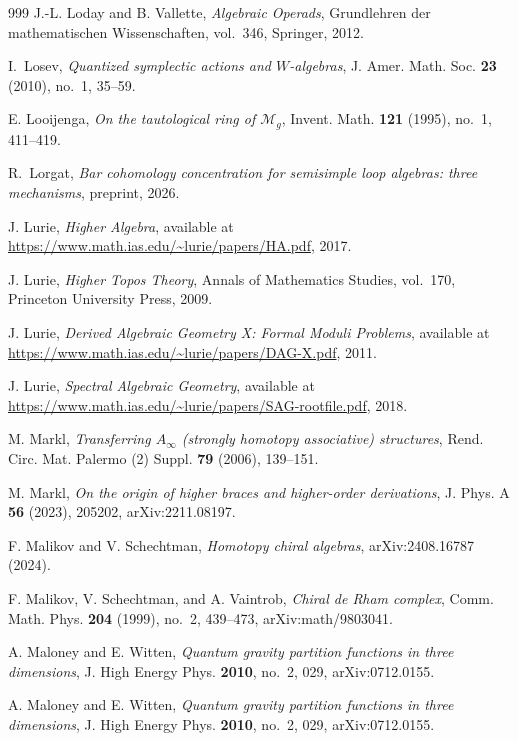 \begin{thebibliography}{999}
J.-L. Loday and B. Vallette, \emph{Algebraic Operads}, Grundlehren der mathematischen Wissenschaften, vol.~346, Springer, 2012.

I.~Losev, \emph{Quantized symplectic actions and $W$-algebras}, J. Amer. Math. Soc. \textbf{23} (2010), no.~1, 35--59.

E. Looijenga, \emph{On the tautological ring of $\mathcal{M}_g$}, Invent. Math. \textbf{121} (1995), no.~1, 411--419.

R.~Lorgat, \emph{Bar cohomology concentration for semisimple loop algebras: three mechanisms}, preprint, 2026.

J. Lurie, \emph{Higher Algebra}, available at \url{https://www.math.ias.edu/~lurie/papers/HA.pdf}, 2017.

J. Lurie, \emph{Higher Topos Theory}, Annals of Mathematics Studies, vol.~170, Princeton University Press, 2009.

J. Lurie, \emph{Derived Algebraic Geometry X: Formal Moduli Problems}, available at \url{https://www.math.ias.edu/~lurie/papers/DAG-X.pdf}, 2011.

J. Lurie, \emph{Spectral Algebraic Geometry}, available at \url{https://www.math.ias.edu/~lurie/papers/SAG-rootfile.pdf}, 2018.

M. Markl, \emph{Transferring $A_\infty$ (strongly homotopy associative) structures}, Rend. Circ. Mat. Palermo (2) Suppl. \textbf{79} (2006), 139--151.

M. Markl, \emph{On the origin of higher braces and higher-order derivations}, J. Phys. A \textbf{56} (2023), 205202, arXiv:2211.08197.

F. Malikov and V. Schechtman, \emph{Homotopy chiral algebras}, arXiv:2408.16787 (2024).


F. Malikov, V. Schechtman, and A. Vaintrob, \emph{Chiral de Rham complex}, Comm. Math. Phys. \textbf{204} (1999), no.~2, 439--473, arXiv:math/9803041.

A. Maloney and E. Witten, \emph{Quantum gravity partition functions in three dimensions}, J. High Energy Phys. \textbf{2010}, no.~2, 029, arXiv:0712.0155.

A. Maloney and E. Witten, \emph{Quantum gravity partition functions in three dimensions}, J. High Energy Phys. \textbf{2010}, no.~2, 029, arXiv:0712.0155.


\end{thebibliography}
